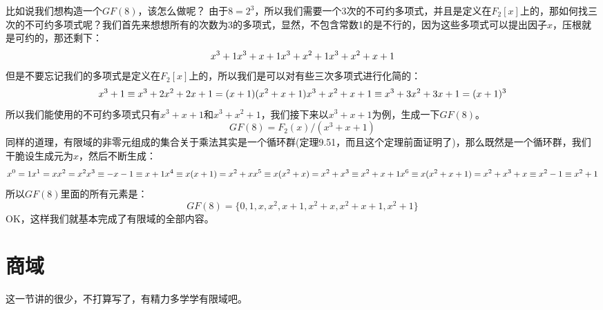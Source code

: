 \documentclass[12pt, a4paper, oneside]{ctexart}
\begin{document}
比如说我们想构造一个$GF(8)$，该怎么做呢？
由于$8=2^3$，所以我们需要一个3次的不可约多项式，并且是定义在$F_2[x]$上的，那如何找三次的不可约多项式呢？我们首先来想想所有的次数为3的多项式，显然，不包含常数1的是不行的，因为这些多项式可以提出因子$x$，压根就是可约的，那还剩下：
\[
x^3+1\\
x^3+x+1\\
x^3+x^2+1\\
x^3+x^2+x+1
\]
但是不要忘记我们的多项式是定义在$F_2[x]$上的，所以我们是可以对有些三次多项式进行化简的：
\[
x^3+1\equiv x^3+2x^2+2x+1=(x+1)(x^2+x+1)\\
x^3+x^2+x+1\equiv x^3+3x^2+3x+1=(x+1)^3
\]
所以我们能使用的不可约多项式只有$x^3+x+1$和$x^3+x^2+1$，我们接下来以$x^3+x+1$为例，生成一下$GF(8)$。
\[
GF(8)=F_2(x)/(x^3+x+1)
\]
同样的道理，有限域的非零元组成的集合关于乘法其实是一个循环群(定理9.51，而且这个定理前面证明了)，那么既然是一个循环群，我们干脆设生成元为$x$，然后不断生成：
\[
x^0=1\\
x^1=x\\
x^2=x^2\\
x^3\equiv -x-1\equiv x+1\\
x^4 \equiv x(x+1)=x^2+x\\
x^5\equiv x(x^2+x)=x^2+x^3\equiv x^2+x+1\\
x^6\equiv x(x^2+x+1)=x^2+x^3+x\equiv x^2-1\equiv x^2+1
\]
所以$GF(8)$里面的所有元素是：
\[
GF(8)=\{0,1,x,x^2,x+1,x^2+x,x^2+x+1,x^2+1\}
\]
OK，这样我们就基本完成了有限域的全部内容。
\section{商域}


这一节讲的很少，不打算写了，有精力多学学有限域吧。
\end{document}
